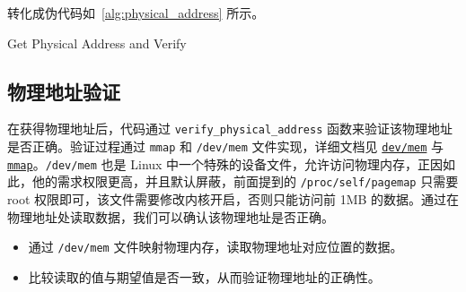 转化成伪代码如~\autoref{alg:physical_address} 所示。

\begin{algorithm}[htbp]
    \caption{Get Physical Address and Verify}
    \label{alg:physical_address}
    
    \end{algorithm}

\subsection{物理地址验证}

在获得物理地址后，代码通过 \texttt{verify\_physical\_address} 函数来验证该物理地址是否正确。验证过程通过 \texttt{mmap} 和 \texttt{/dev/mem} 文件实现，详细文档见 \href{https://man7.org/linux/man-pages/man4/mem.4.html}{\texttt{dev/mem}} 与 \href{https://man7.org/linux/man-pages/man2/mmap.2.html}{\texttt{mmap}}。\texttt{/dev/mem} 也是 Linux 中一个特殊的设备文件，允许访问物理内存，正因如此，他的需求权限更高，并且默认屏蔽，前面提到的 \texttt{/proc/self/pagemap} 只需要 root 权限即可，该文件需要修改内核开启，否则只能访问前 1MB 的数据。通过在物理地址处读取数据，我们可以确认该物理地址是否正确。
\begin{itemize}
    \item 通过 \texttt{/dev/mem} 文件映射物理内存，读取物理地址对应位置的数据。
    \item 比较读取的值与期望值是否一致，从而验证物理地址的正确性。
\end{itemize}

